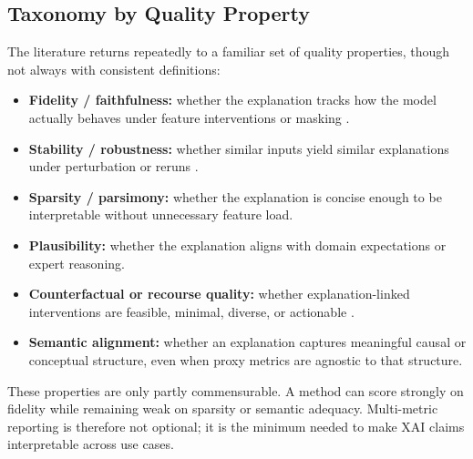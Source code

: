 \documentclass[10pt]{article}
\begin{document}
\subsection{Taxonomy by Quality Property}

The literature returns repeatedly to a familiar set of quality properties,
though not always with consistent definitions:
\begin{itemize}[leftmargin=*]
\item \textbf{Fidelity / faithfulness:} whether the explanation tracks
how the model actually behaves under feature interventions or masking
\citep{ribeiro2016why,lundberg2017unified,zheng2025ffidelity}.
\item \textbf{Stability / robustness:} whether similar inputs yield
similar explanations under perturbation or reruns
\citep{pawlicki2024metrics,canha2025benchmark}.
\item \textbf{Sparsity / parsimony:} whether the explanation is concise
enough to be interpretable without unnecessary feature load.
\item \textbf{Plausibility:} whether the explanation aligns with domain
expectations or expert reasoning.
\item \textbf{Counterfactual or recourse quality:} whether
explanation-linked interventions are feasible, minimal, diverse, or
actionable \citep{mothilal2020dice}.
\item \textbf{Semantic alignment:} whether an explanation captures
meaningful causal or conceptual structure, even when proxy metrics are
agnostic to that structure.
\end{itemize}

These properties are only partly commensurable. A method can score
strongly on fidelity while remaining weak on sparsity or semantic
adequacy. Multi-metric reporting is therefore not optional; it is the
minimum needed to make XAI claims interpretable across use cases.
\end{document}
